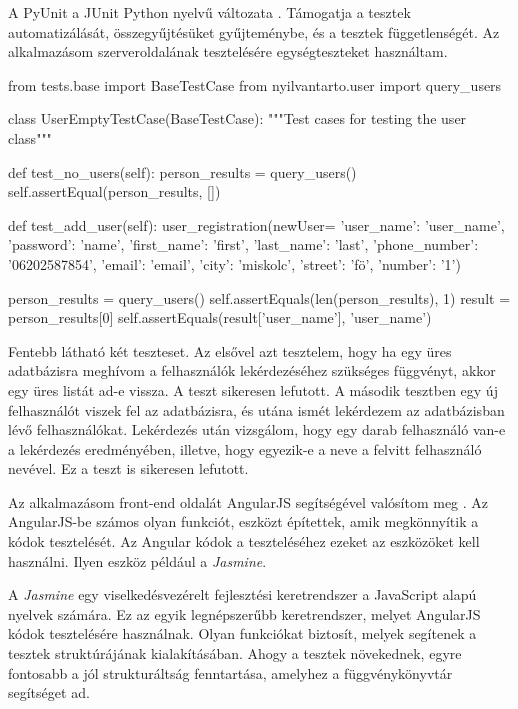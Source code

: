A PyUnit a JUnit Python nyelvű változata \cite{python_test}. Támogatja a tesztek automatizálását, összegyűjtésüket gyűjteménybe, és a tesztek függetlenségét. Az alkalmazásom szerveroldalának tesztelésére egységteszteket használtam.

\begin{python}
from tests.base import BaseTestCase
from nyilvantarto.user import query_users

class UserEmptyTestCase(BaseTestCase):
 """Test cases for testing the user class"""
 
    def test_no_users(self):
        person_results = query_users()
        self.assertEqual(person_results, [])

    def test_add_user(self):
        user_registration(newUser=
            {'user_name': 'user_name', 'password': 'name',
             'first_name': 'first', 'last_name': 'last',
             'phone_number': '06202587854', 'email': 'email',
             'city': 'miskolc', 'street': 'f\"o',
             'number': '1'})

        person_results = query_users()
        self.assertEquals(len(person_results), 1)
        result = person_results[0]
        self.assertEquals(result['user_name'], 'user_name')
\end{python}

\newpage

Fentebb látható két teszteset. Az elsővel azt tesztelem, hogy ha egy üres adatbázisra meghívom a felhasználók lekérdezéséhez szükséges függvényt, akkor egy üres listát ad-e vissza. A teszt sikeresen lefutott. A második tesztben egy új felhasználót viszek fel az adatbázisra, és utána ismét lekérdezem az adatbázisban lévő felhasználókat. Lekérdezés után vizsgálom, hogy egy darab felhasználó van-e a lekérdezés eredményében, illetve, hogy egyezik-e a neve a felvitt felhasználó nevével. Ez a teszt is sikeresen lefutott.


Az alkalmazásom front-end oldalát AngularJS segítségével valósítom meg \cite{angular_test}. Az AngularJS-be számos olyan funkciót, eszközt építettek, amik megkönnyítik a kódok tesztelését. Az Angular kódok a teszteléséhez ezeket az eszközöket kell használni. Ilyen eszköz például a \textit{Jasmine}.

A \textit{Jasmine} egy viselkedésvezérelt fejlesztési keretrendszer a JavaScript alapú nyelvek számára. Ez az egyik legnépszerűbb keretrendszer, melyet AngularJS kódok tesztelésére használnak. Olyan funkciókat biztosít, melyek segítenek a tesztek struktúrájának kialakításában. Ahogy a tesztek növekednek, egyre fontosabb a jól strukturáltság fenntartása, amelyhez a függvénykönyvtár segítséget ad.
